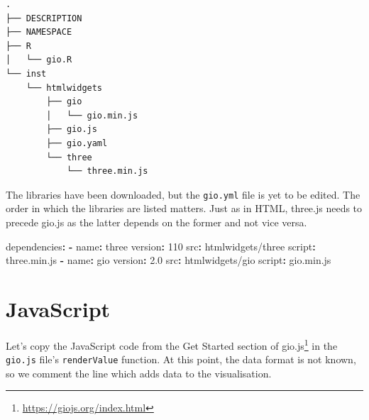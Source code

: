 \documentclass[
]{krantz}
\makeatletter
\newenvironment{Shaded}{\begin{snugshade}}{\end{snugshade}}
\newcommand{\AttributeTok}[1]{\textcolor[rgb]{0.61,0.61,0.61}{#1}}
\newcommand{\DecValTok}[1]{\textcolor[rgb]{0.06,0.06,0.06}{#1}}
\newcommand{\FloatTok}[1]{\textcolor[rgb]{0.06,0.06,0.06}{#1}}
\newcommand{\FunctionTok}[1]{\textcolor[rgb]{0,0,0}{#1}}
\newcommand{\KeywordTok}[1]{\textcolor[rgb]{0.27,0.27,0.27}{\textbf{#1}}}
\renewcommand{\href}[2]{#2\footnote{\url{#1}}}
\newenvironment{kframe}{%
\medskip{}
\setlength{\fboxsep}{.8em}
 \def\at@end@of@kframe{}%
 \ifinner\ifhmode%
  \def\at@end@of@kframe{\end{minipage}}%
  \begin{minipage}{\columnwidth}%
 \fi\fi%
 \def\FrameCommand##1{\hskip\@totalleftmargin \hskip-\fboxsep
 \colorbox{shadecolor}{##1}\hskip-\fboxsep
     \hskip-\linewidth \hskip-\@totalleftmargin \hskip\columnwidth}%
 \MakeFramed {\advance\hsize-\width
   \@totalleftmargin\z@ \linewidth\hsize
   \@setminipage}}%
 {\par\unskip\endMakeFramed%
 \at@end@of@kframe}
\renewenvironment{Shaded}{\begin{kframe}}{\end{kframe}}
\makeatother
\begin{document}
\begin{verbatim}
.
├── DESCRIPTION
├── NAMESPACE
├── R
│   └── gio.R
└── inst
    └── htmlwidgets
        ├── gio
        │   └── gio.min.js
        ├── gio.js
        ├── gio.yaml
        └── three
            └── three.min.js
\end{verbatim}

The libraries have been downloaded, but the \texttt{gio.yml} file is yet to be edited. The order in which the libraries are listed matters. Just as in HTML, three.js needs to precede gio.js as the latter depends on the former and not vice versa.

\begin{Shaded}
\begin{Highlighting}[]
\FunctionTok{dependencies}\KeywordTok{:}
\AttributeTok{  }\KeywordTok{{-}}\AttributeTok{ }\FunctionTok{name}\KeywordTok{:}\AttributeTok{ three}
\AttributeTok{    }\FunctionTok{version}\KeywordTok{:}\AttributeTok{ }\DecValTok{110}
\AttributeTok{    }\FunctionTok{src}\KeywordTok{:}\AttributeTok{ htmlwidgets/three}
\AttributeTok{    }\FunctionTok{script}\KeywordTok{:}\AttributeTok{ three.min.js}
\AttributeTok{  }\KeywordTok{{-}}\AttributeTok{ }\FunctionTok{name}\KeywordTok{:}\AttributeTok{ gio}
\AttributeTok{    }\FunctionTok{version}\KeywordTok{:}\AttributeTok{ }\FloatTok{2.0}
\AttributeTok{    }\FunctionTok{src}\KeywordTok{:}\AttributeTok{ htmlwidgets/gio}
\AttributeTok{    }\FunctionTok{script}\KeywordTok{:}\AttributeTok{ gio.min.js}
\end{Highlighting}
\end{Shaded}

\hypertarget{widgets-full-js}{%
\section{JavaScript}\label{widgets-full-js}}

Let's copy the JavaScript code from the \href{https://giojs.org/index.html}{Get Started section of gio.js} in the \texttt{gio.js} file's \texttt{renderValue} function. At this point, the data format is not known, so we comment the line which adds data to the visualisation.
\end{document}
